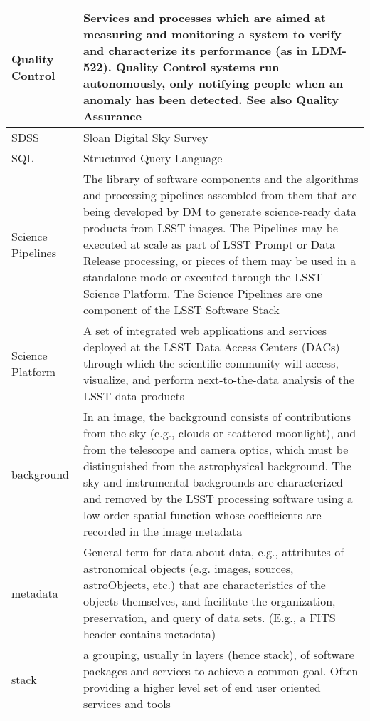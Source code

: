 \begin{longtable}{|p{}|p{}|}
Quality Control & Services and processes which are aimed at measuring and monitoring a system to verify and characterize its performance (as in LDM-522). Quality Control systems run autonomously, only notifying people when an anomaly has been detected. See also Quality Assurance \\\hline
SDSS & Sloan Digital Sky Survey \\\hline
SQL & Structured Query Language \\\hline
Science Pipelines & The library of software components and the algorithms and processing pipelines assembled from them that are being developed by DM to generate science-ready data products from LSST images. The Pipelines may be executed at scale as part of LSST Prompt or Data Release processing, or pieces of them may be used in a standalone mode or executed through the LSST Science Platform. The Science Pipelines are one component of the LSST Software Stack \\\hline
Science Platform & A set of integrated web applications and services deployed at the LSST Data Access Centers (DACs) through which the scientific community will access, visualize, and perform next-to-the-data analysis of the LSST data products \\\hline
background & In an image, the background consists of contributions from the sky (e.g., clouds or scattered moonlight), and from the telescope and camera optics, which must be distinguished from the astrophysical background. The sky and instrumental backgrounds are characterized and removed by the LSST processing software using a low-order spatial function whose coefficients are recorded in the image metadata \\\hline
metadata & General term for data about data, e.g., attributes of astronomical objects (e.g. images, sources, astroObjects, etc.) that are characteristics of the objects themselves, and facilitate the organization, preservation, and query of data sets. (E.g., a FITS header contains metadata) \\\hline
stack & a grouping, usually in layers (hence stack), of software packages and services to achieve a common goal. Often providing a higher level set of end user oriented services and tools \\\hline
\end{longtable}
